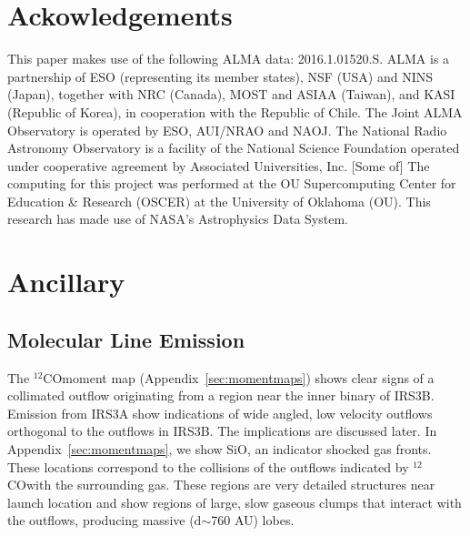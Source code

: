 \documentclass[preprint,12pt]{aastex62}
\newcommand{\co}{$^{12}$CO}
\newcommand{\sio}{SiO}
\newcommand{\ab}{$\sim$}
\begin{document}
\section*{Ackowledgements}
This paper makes use of the following ALMA data: 2016.1.01520.S. ALMA is a partnership of ESO (representing its member states), NSF (USA) and NINS (Japan), together with NRC (Canada), MOST and ASIAA (Taiwan), and KASI (Republic of Korea), in cooperation with the Republic of Chile.  The Joint ALMA Observatory is operated by ESO, AUI/NRAO and NAOJ. The National Radio Astronomy Observatory is a facility of the National Science Foundation operated under cooperative agreement by Associated Universities, Inc. [Some of] The computing for this project was performed at the OU Supercomputing Center for Education \& Research (OSCER) at the University of Oklahoma (OU). This research has made use of NASA's Astrophysics Data System.
\newpage
\section{Ancillary}\label{sec:anc}






\subsection{Molecular Line Emission}
The \co\space moment map (Appendix~\ref{sec:momentmaps}) shows clear signs of a collimated outflow originating from a region near the inner binary of IRS3B. Emission from IRS3A show indications of wide angled, low velocity outflows orthogonal to the outflows in IRS3B. The implications are discussed later. In Appendix~\ref{sec:momentmaps}, we show \sio, an indicator shocked gas fronts. These locations correspond to the collisions of the outflows indicated by \co\space with the surrounding gas. These regions are very detailed structures near launch location and show regions of large, slow gaseous clumps that interact with the outflows, producing massive (d\ab760 AU) lobes.

\clearpage
\end{document}
